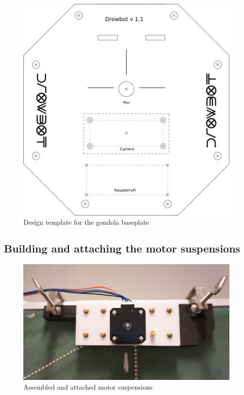 \documentclass[a4paper,10pt]{article}
\begin{document}
\begin{figure}[h!]
  \centering
  \includegraphics{img/gondola.png}
  \caption{Design template for the gondola baseplate}
  \label{fig:baseplate}
\end{figure}

\subsection{Building and attaching the motor suspensions}

\begin{figure}[h!]
  \centering
  \includegraphics{img/motorsusp.jpg}
  \caption{Assembled and attached motor suspensions}
  \label{fig:gondola}
\end{figure}
\end{document}
